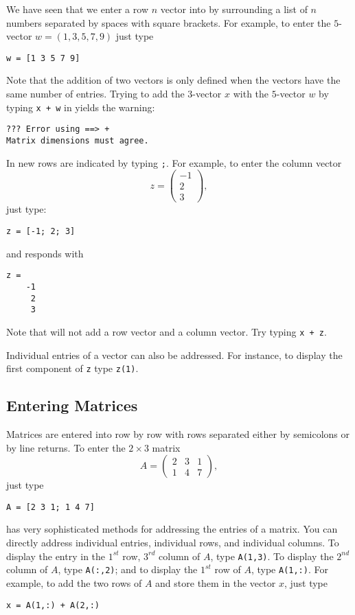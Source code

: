 \documentclass{ximera}
\begin{document}
We have seen that we enter a row $n$ vector into \Matlab by
surrounding a list of $n$ numbers separated by spaces with
square brackets.  For example, to enter the $5$-vector
$w=(1,3,5,7,9)$ just type
\begin{verbatim}
w = [1 3 5 7 9]
\end{verbatim}
Note that the addition of two vectors is only defined when the
vectors have the same number of entries.  Trying to add the
$3$-vector $x$ with the $5$-vector $w$ by typing {\tt x + w} in \Matlab
yields the warning:
\begin{verbatim}
??? Error using ==> +
Matrix dimensions must agree.
\end{verbatim}

In \Matlab new rows are indicated by typing {\tt ;}. For
example, to enter the column vector
\[
z=\left(\begin{array}{r} -1 \\ 2\\ 3 \end{array}\right),
\]
just type:
\begin{verbatim}
z = [-1; 2; 3]
\end{verbatim}
\index{\computer![1; 2; 3]} and \Matlab responds with
\begin{verbatim}
z =
    -1
     2
     3
\end{verbatim}
Note that \Matlab will not add a row vector and a column vector.
Try typing {\tt x + z}.

Individual entries of a vector can also be addressed.  For instance,
to display the first component of {\tt z} type {\tt z(1)}.

\subsection*{Entering Matrices}

Matrices are entered into \Matlab row by row with
rows separated either by semicolons or by line returns.  To enter
the $2\times 3$ matrix
\[
A=\left(\begin{array}{ccc} 2 & 3 & 1 \\ 1 & 4 & 7
\end{array}\right),
\]
just type
\begin{verbatim}
A = [2 3 1; 1 4 7]
\end{verbatim}

\Matlab has very sophisticated methods for addressing the entries
of a matrix.  You can directly address individual entries,
individual rows, and individual columns.  To display the entry in
the $1^{st}$ row, $3^{rd}$ column of $A$, type {\tt A(1,3)}.  To
display the $2^{nd}$ column of $A$, type {\tt A(:,2)}; and to
display the $1^{st}$ row of $A$, type {\tt A(1,:)}.  For example,
to add the two rows of $A$ and store them in the vector $x$,
just type
\begin{verbatim}
x = A(1,:) + A(2,:)
\end{verbatim}
\index{\computer!:}
\end{document}
